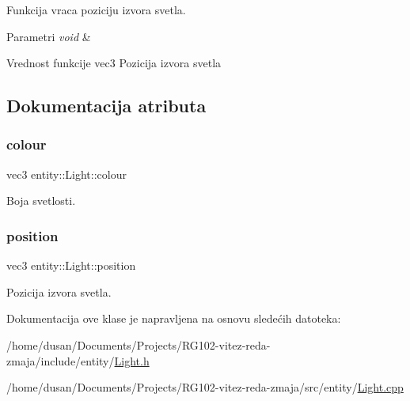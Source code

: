 Funkcija vraca poziciju izvora svetla. 


\begin{DoxyParams}{Parametri}
{\em void} & \\
\hline
\end{DoxyParams}
\begin{DoxyReturn}{Vrednost funkcije}
vec3 Pozicija izvora svetla 
\end{DoxyReturn}


\subsection{Dokumentacija atributa}
\mbox{\label{classentity_1_1Light_a637c529cb886fb092ea0775b4821671d}} 
\subsubsection{\texorpdfstring{colour}{colour}}
{\footnotesize\ttfamily vec3 entity\+::\+Light\+::colour\hspace{0.3cm}{\ttfamily [private]}}



Boja svetlosti. 

\mbox{\label{classentity_1_1Light_a1c8e3d9bb8ba4f1c4e1c370cfa5ebe15}} 
\subsubsection{\texorpdfstring{position}{position}}
{\footnotesize\ttfamily vec3 entity\+::\+Light\+::position\hspace{0.3cm}{\ttfamily [private]}}



Pozicija izvora svetla. 



Dokumentacija ove klase je napravljena na osnovu sledećih datoteka\+:\begin{DoxyCompactItemize}
\item 
/home/dusan/\+Documents/\+Projects/\+R\+G102-\/vitez-\/reda-\/zmaja/include/entity/\hyperlink{Light_8h}{Light.\+h}\item 
/home/dusan/\+Documents/\+Projects/\+R\+G102-\/vitez-\/reda-\/zmaja/src/entity/\hyperlink{Light_8cpp}{Light.\+cpp}\end{DoxyCompactItemize}
